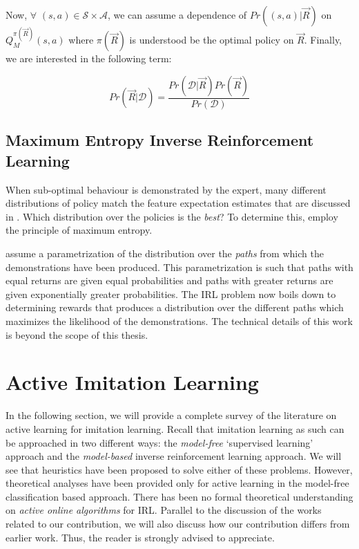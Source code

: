 Now, $\forall$ $(s,a) \in \mathcal{S} \times \mathcal{A}$, we can assume a dependence of $Pr( (s,a) | \vec{R})$ on $Q^{\pi(\vec{R})}_{M}(s,a)$ where $\pi(\vec{R})$ is understood be the optimal policy on $\vec{R}$.  Finally,  we are interested in the following term:

\begin{equation}
Pr(\vec{R} | \mathcal{D}) = \frac{Pr(\mathcal{D}| \vec{R}) Pr(\vec{R})}{Pr(\mathcal{D})}
\end{equation}

\subsection{Maximum Entropy Inverse Reinforcement Learning}
When sub-optimal behaviour is demonstrated by the expert, many different distributions of policy match the feature expectation estimates that are discussed in \citet{Abbeel:2004:ALV:1015330.1015430}. Which distribution over the policies is the \textit{best}? To determine this, \citet{Ziebart:2008:MEI:1620270.1620297} employ the principle of maximum entropy. 

\citet{Ziebart:2008:MEI:1620270.1620297} assume a parametrization of the distribution over the \textit{paths} from which the demonstrations have been produced. This parametrization is such that paths with equal returns are given equal probabilities and paths with greater returns are given exponentially greater probabilities. The IRL problem now boils down to determining rewards that produces a distribution over the different paths which maximizes the likelihood of the demonstrations. The technical details of this work is beyond the scope of this thesis. \\


\section{Active Imitation Learning}

In the following section, we will provide a complete survey of the literature on active learning for imitation learning. Recall that imitation learning as such can be approached in two different ways: the \textit{model-free} `supervised learning' approach and the \textit{model-based} inverse reinforcement learning approach. We will see that heuristics have been proposed to solve either of these problems. However, theoretical analyses have been provided only for active learning in the model-free classification based approach. There has been no formal theoretical understanding on \textit{active online algorithms} for IRL. Parallel to the discussion of the works related to our contribution, we will also discuss how our contribution differs from earlier work. Thus, the reader is strongly advised to appreciate.\\




